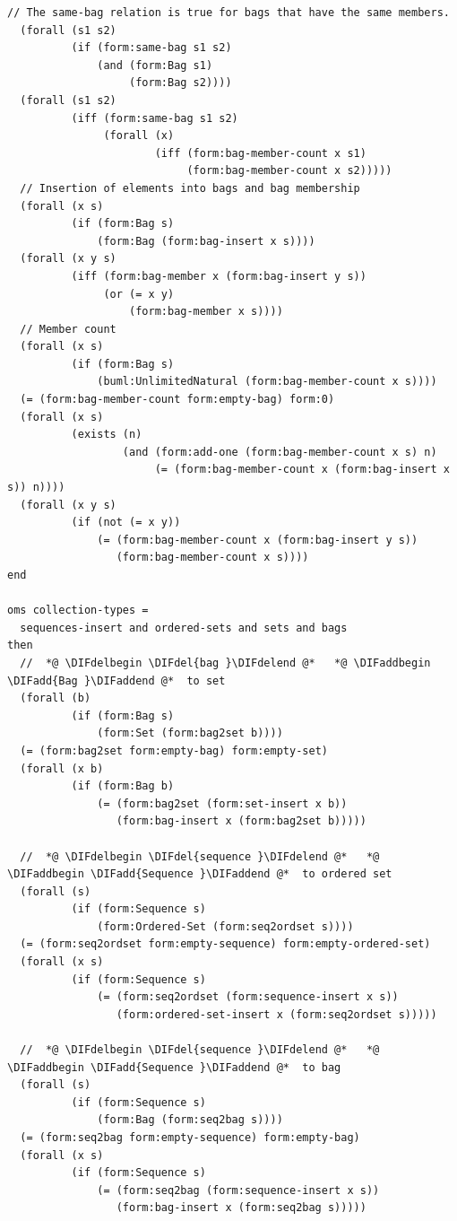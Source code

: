 \documentclass[10pt,fleqn,final]{scrreprt}
\providecommand{\DIFadd}[1]{{\protect\color{blue}\uwave{#1}}} %
\providecommand{\DIFdel}[1]{{\protect\color{red}\sout{#1}}}                      %
\providecommand{\DIFaddbegin}{} %
\providecommand{\DIFaddend}{} %
\providecommand{\DIFdelbegin}{} %
\providecommand{\DIFdelend}{} %
\begin{document}
\begin{lstlisting}[language=clif,morekeywords={then,with,logic,oms,end},mathescape]
  // The same-bag relation is true for bags that have the same members.
  (forall (s1 s2)
          (if (form:same-bag s1 s2)
              (and (form:Bag s1)
                   (form:Bag s2))))
  (forall (s1 s2)
          (iff (form:same-bag s1 s2)
               (forall (x)
                       (iff (form:bag-member-count x s1)
                            (form:bag-member-count x s2)))))
  // Insertion of elements into bags and bag membership
  (forall (x s)
          (if (form:Bag s)
              (form:Bag (form:bag-insert x s))))
  (forall (x y s)
          (iff (form:bag-member x (form:bag-insert y s))
               (or (= x y)
                   (form:bag-member x s))))
  // Member count
  (forall (x s)
          (if (form:Bag s)
              (buml:UnlimitedNatural (form:bag-member-count x s))))
  (= (form:bag-member-count form:empty-bag) form:0)
  (forall (x s)
          (exists (n)
                  (and (form:add-one (form:bag-member-count x s) n)
                       (= (form:bag-member-count x (form:bag-insert x s)) n))))
  (forall (x y s)
          (if (not (= x y))
              (= (form:bag-member-count x (form:bag-insert y s))
                 (form:bag-member-count x s))))
end

oms collection-types =
  sequences-insert and ordered-sets and sets and bags
then
  //  *@ \DIFdelbegin \DIFdel{bag }\DIFdelend @*   *@ \DIFaddbegin \DIFadd{Bag }\DIFaddend @*  to set
  (forall (b)
          (if (form:Bag s)
              (form:Set (form:bag2set b))))
  (= (form:bag2set form:empty-bag) form:empty-set)
  (forall (x b)
          (if (form:Bag b)
              (= (form:bag2set (form:set-insert x b))
                 (form:bag-insert x (form:bag2set b)))))

  //  *@ \DIFdelbegin \DIFdel{sequence }\DIFdelend @*   *@ \DIFaddbegin \DIFadd{Sequence }\DIFaddend @*  to ordered set
  (forall (s)
          (if (form:Sequence s)
              (form:Ordered-Set (form:seq2ordset s))))
  (= (form:seq2ordset form:empty-sequence) form:empty-ordered-set)
  (forall (x s)
          (if (form:Sequence s)
              (= (form:seq2ordset (form:sequence-insert x s))
                 (form:ordered-set-insert x (form:seq2ordset s)))))

  //  *@ \DIFdelbegin \DIFdel{sequence }\DIFdelend @*   *@ \DIFaddbegin \DIFadd{Sequence }\DIFaddend @*  to bag
  (forall (s)
          (if (form:Sequence s)
              (form:Bag (form:seq2bag s))))
  (= (form:seq2bag form:empty-sequence) form:empty-bag)
  (forall (x s)
          (if (form:Sequence s)
              (= (form:seq2bag (form:sequence-insert x s))
                 (form:bag-insert x (form:seq2bag s)))))


\end{lstlisting}
\end{document}
